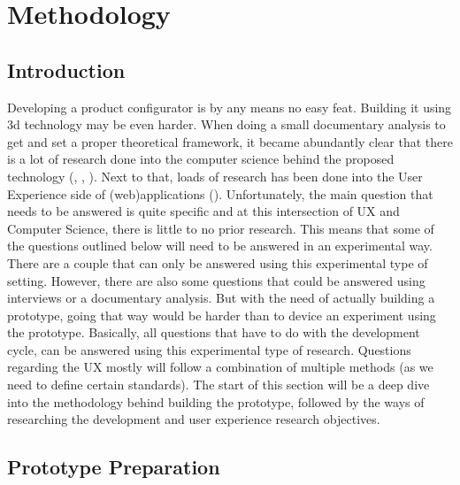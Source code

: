 

\chapter{Methodology}
\section{Introduction}
Developing a product configurator is by any means no easy feat. Building it using 3d technology may be even harder. When doing a small documentary analysis to get and set a proper theoretical framework, it became abundantly clear that there is a lot of research done into the computer science behind the proposed technology (\cite{openGLsite}, \cite{microservices}, \cite{heteregoneousComputingTechniques}). Next to that, loads of research has been done into the User Experience side of (web)applications (\cite{nielsonNormanReports}). Unfortunately, the main question that needs to be answered is quite specific and at this intersection of UX and Computer Science, there is little to no prior research. This means that some of the questions outlined below will need to be answered in an experimental way. There are a couple that can only be answered using this experimental type of setting. However, there are also some questions that could be answered using interviews or a documentary analysis. But with the need of actually building a prototype, going that way would be harder than to device an experiment using the prototype.
Basically, all questions that have to do with the development cycle, can be answered using this experimental type of research. Questions regarding the UX mostly will follow a combination of multiple methods (as we need to define certain standards). The start of this section will be a deep dive into the methodology behind building the prototype, followed by the ways of researching the development and user experience research objectives.

\section{Prototype Preparation}
